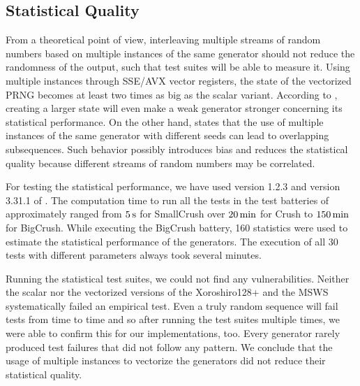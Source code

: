 \documentclass{stdlocal}
\begin{document}
  \subsection{Statistical Quality} %
  \label{sub:statistical_quality}
    From a theoretical point of view, interleaving multiple streams of random numbers based on multiple instances of the same generator should not reduce the randomness of the output, such that test suites will be able to measure it.
    Using multiple instances through SSE/AVX vector registers, the state of the vectorized PRNG becomes at least two times as big as the scalar variant.
    According to \textcite{oneill-blog-toobig}, creating a larger state will even make a weak generator stronger concerning its statistical performance.
    On the other hand, \textcite{fog2015} states that the use of multiple instances of the same generator with different seeds can lead to overlapping subsequences.
    Such behavior possibly introduces bias and reduces the statistical quality because different streams of random numbers may be correlated.

    For testing the statistical performance, we have used  version 1.2.3 and version 3.31.1 of .
    The computation time to run all the tests in the test batteries of  approximately ranged from $5\, \mathrm{s}$ for SmallCrush over $20\, \mathrm{min}$ for Crush to $150\, \mathrm{min}$ for BigCrush.
    While executing the BigCrush battery, 160 statistics were used to estimate the statistical performance of the generators.
    The execution of all 30  tests with different parameters always took several minutes.

    Running the statistical test suites, we could not find any vulnerabilities.
    Neither the scalar nor the vectorized versions of the Xoroshiro128+ and the MSWS systematically failed an empirical test.
    Even a truly random sequence will fail tests from time to time \autocite[\pno~142]{kneusel2018} and so after running the test suites multiple times, we were able to confirm this for our implementations, too.
    Every generator rarely produced test failures that did not follow any pattern.
    We conclude that the usage of multiple instances to vectorize the generators did not reduce their statistical quality.
\end{document}
